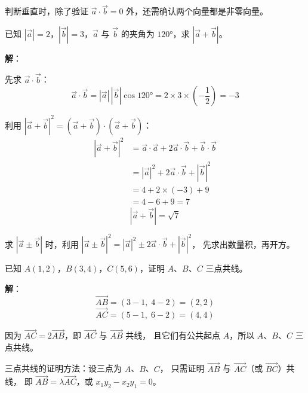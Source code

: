 \documentclass[12pt, a4paper]{ctexart}
\begin{document}
\begin{warnbox}[易错提醒]
判断垂直时，除了验证 $\vec{a}\cdot\vec{b}=0$ 外，还需确认两个向量都是非零向量。
\end{warnbox}

\begin{examplebox}[【例题6】利用数量积求模]
已知 $|\vec{a}|=2$，$|\vec{b}|=3$，$\vec{a}$ 与 $\vec{b}$ 的夹角为 $120°$，求 $|\vec{a}+\vec{b}|$。
\end{examplebox}

\textbf{解}：

先求 $\vec{a}\cdot\vec{b}$：
\[
\vec{a}\cdot\vec{b} = |\vec{a}|\,|\vec{b}|\cos 120° = 2 \times 3 \times \left(-\frac{1}{2}\right) = -3
\]

利用 $|\vec{a}+\vec{b}|^2 = (\vec{a}+\vec{b})\cdot(\vec{a}+\vec{b})$：
\begin{align*}
|\vec{a}+\vec{b}|^2
  &= \vec{a}\cdot\vec{a} + 2\vec{a}\cdot\vec{b} + \vec{b}\cdot\vec{b} \\
  &= |\vec{a}|^2 + 2\vec{a}\cdot\vec{b} + |\vec{b}|^2 \\
  &= 4 + 2\times(-3) + 9 \\
  &= 4 - 6 + 9 = 7
\end{align*}
\[
|\vec{a}+\vec{b}| = \sqrt{7}
\]

\begin{tipbox}[方法总结]
求 $|\vec{a}\pm\vec{b}|$ 时，利用 $|\vec{a}\pm\vec{b}|^2 = |\vec{a}|^2 \pm 2\vec{a}\cdot\vec{b} + |\vec{b}|^2$，
先求出数量积，再开方。
\end{tipbox}

\begin{examplebox}[【例题7】三点共线的证明]
已知 $A(1,2)$，$B(3,4)$，$C(5,6)$，证明 $A$、$B$、$C$ 三点共线。
\end{examplebox}

\textbf{解}：
\[
\overrightarrow{AB} = (3-1,\; 4-2) = (2, 2)
\]
\[
\overrightarrow{AC} = (5-1,\; 6-2) = (4, 4)
\]

因为 $\overrightarrow{AC} = 2\overrightarrow{AB}$，即 $\overrightarrow{AC}$ 与 $\overrightarrow{AB}$ 共线，
且它们有公共起点 $A$，所以 $A$、$B$、$C$ 三点共线。

\begin{tipbox}[方法总结]
三点共线的证明方法：设三点为 $A$、$B$、$C$，
只需证明 $\overrightarrow{AB}$ 与 $\overrightarrow{AC}$（或 $\overrightarrow{BC}$）共线，
即 $\overrightarrow{AB} = \lambda \overrightarrow{AC}$，或 $x_1 y_2 - x_2 y_1 = 0$。
\end{tipbox}
\end{document}
